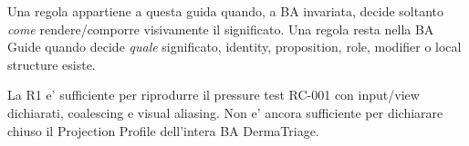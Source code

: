 \documentclass[11pt,a4paper]{article}
\begin{document}
\begin{ddtaprinciple}[title={Criterio per spostare una regola qui dalla BA Guide}]
Una regola appartiene a questa guida quando, a BA invariata, decide soltanto \emph{come} rendere/comporre visivamente il significato. Una regola resta nella BA Guide quando decide \emph{quale} significato, identity, proposition, role, modifier o local structure esiste.
\end{ddtaprinciple}

\begin{ddtaopen}[title={Stato R1}]
La R1 e' sufficiente per riprodurre il pressure test RC-001 con input/view dichiarati, coalescing e visual aliasing. Non e' ancora sufficiente per dichiarare chiuso il Projection Profile dell'intera BA DermaTriage.
\end{ddtaopen}
\end{document}
